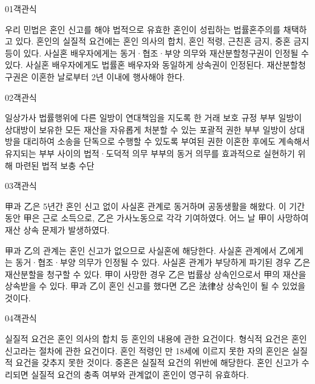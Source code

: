\documentclass[fs85,seriesWit]{korfarm-base}
\begin{document}
\kfBeginMC
\begin{kfQBlock}{01}{객관식}
\begin{kfChoices}
\kfChoice 우리 민법은 혼인 신고를 해야 법적으로 유효한 혼인이 성립하는 법률혼주의를 채택하고 있다.
\kfChoice 혼인의 실질적 요건에는 혼인 의사의 합치, 혼인 적령, 근친혼 금지, 중혼 금지 등이 있다.
\kfChoice 사실혼 배우자에게는 동거·협조·부양 의무와 재산분할청구권이 인정될 수 있다.
\kfChoice 사실혼 배우자에게도 법률혼 배우자와 동일하게 상속권이 인정된다.
\kfChoice 재산분할청구권은 이혼한 날로부터 2년 이내에 행사해야 한다.
\end{kfChoices}
\end{kfQBlock}

\begin{kfQBlock}{02}{객관식}
\begin{kfChoices}
\kfChoice 일상가사 법률행위에 다른 일방이 연대책임을 지도록 한 거래 보호 규정
\kfChoice 부부 일방이 상대방이 보유한 모든 재산을 자유롭게 처분할 수 있는 포괄적 권한
\kfChoice 부부 일방이 상대방을 대리하여 소송을 단독으로 수행할 수 있도록 부여된 권한
\kfChoice 이혼한 후에도 계속해서 유지되는 부부 사이의 법적·도덕적 의무
\kfChoice 부부의 동거 의무를 효과적으로 실현하기 위해 마련된 법적 보충 수단
\end{kfChoices}
\end{kfQBlock}

\begin{kfQBlock}{03}{객관식}
\begin{kfEvidence}甲과 乙은 5년간 혼인 신고 없이 사실혼 관계로 동거하며 공동생활을 해왔다. 이 기간 동안 甲은 근로 소득으로, 乙은 가사노동으로 각각 기여하였다. 어느 날 甲이 사망하여 재산 상속 문제가 발생하였다.\end{kfEvidence}
\begin{kfChoices}
\kfChoice 甲과 乙의 관계는 혼인 신고가 없으므로 사실혼에 해당한다.
\kfChoice 사실혼 관계에서 乙에게는 동거·협조·부양 의무가 인정될 수 있다.
\kfChoice 사실혼 관계가 부당하게 파기된 경우 乙은 재산분할을 청구할 수 있다.
\kfChoice 甲이 사망한 경우 乙은 법률상 상속인으로서 甲의 재산을 상속받을 수 있다.
\kfChoice 甲과 乙이 혼인 신고를 했다면 乙은 法律상 상속인이 될 수 있었을 것이다.
\end{kfChoices}
\end{kfQBlock}

\begin{kfQBlock}{04}{객관식}
\begin{kfChoices}
\kfChoice 실질적 요건은 혼인 의사의 합치 등 혼인의 내용에 관한 요건이다.
\kfChoice 형식적 요건은 혼인 신고라는 절차에 관한 요건이다.
\kfChoice 혼인 적령인 만 18세에 이르지 못한 자의 혼인은 실질적 요건을 갖추지 못한 것이다.
\kfChoice 중혼은 실질적 요건의 위반에 해당한다.
\kfChoice 혼인 신고가 수리되면 실질적 요건의 충족 여부와 관계없이 혼인이 영구히 유효하다.
\end{kfChoices}
\end{kfQBlock}
\end{document}
